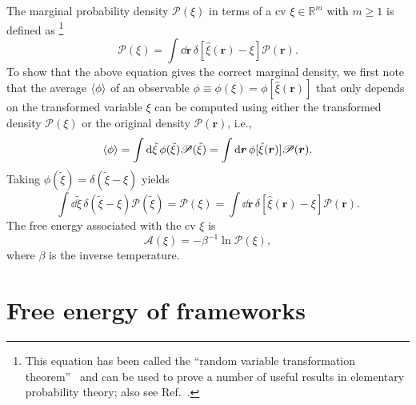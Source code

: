 The marginal probability density $\mathscr{P}(\xi)$ in terms of a \ac{cv} $\xi \in \mathbb{R}^{m}$ with $m \geq 1$ is defined as%
\footnote{This equation has been called the ``random variable transformation theorem''~\cite{gillespie1983} and can be used to prove a number of useful results in elementary probability theory; also see Ref.~\cite[Section~I.5]{kampen2007}.}
%
\begin{equation}
  \mathscr{P}(\xi) = \int \dd{\bm{r}}\, \delta[\hat{\xi}(\bm{r}) - \xi] \mathscr{P}(\bm{r}).
  \label{c03:eq:probtrans}
\end{equation}
%
To show that the above equation gives the correct marginal density, we first note that the average $\mathinner{\langle{\phi}\rangle}$ of an observable $\phi \equiv \phi(\xi) = \phi[\hat{\xi}(\bm{r})]$ that only depends on the transformed variable $\xi$ can be computed using either the transformed density $\mathscr{P}(\xi)$ or the original density $\mathscr{P}(\bm{r})$, i.e.,
%
\begin{equation}
  \mathinner{\langle{\phi}\rangle} = \int \mathrm{d}{\tilde{\xi}}\, \phi(\tilde{\xi}) \mathscr{P}(\tilde{\xi}) = \int \mathrm{d}{\bm{r}}\, \phi[\hat{\xi}(\bm{r})] \mathscr{P}(\bm{r}).
\end{equation}
%
Taking $\phi(\tilde{\xi}) = \delta(\tilde{\xi} - \xi)$ yields
%
\begin{equation}
  \int \dd{\tilde{\xi}}\, \delta(\tilde{\xi} - \xi) \mathscr{P}(\tilde{\xi}) = \mathscr{P}(\xi) = \int \dd{\bm{r}}\, \delta[\hat{\xi}(\bm{r}) - \xi] \mathscr{P}(\bm{r}).
\end{equation}
%
The free energy associated with the \ac{cv} $\xi$ is~\cite{lelievre2010}
%
\begin{equation}
  \mathscr{A}(\xi) = -\beta^{-1}\ln{\mathscr{P}(\xi)},
  \label{eq:free_energy}
\end{equation}
%
where $\beta$ is the inverse temperature.

\section{Free energy of frameworks}

